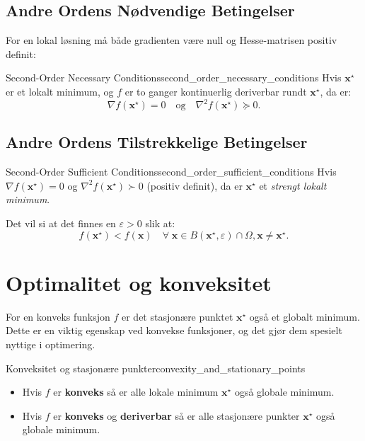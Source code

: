 \subsection{Andre Ordens Nødvendige Betingelser}

For en lokal løsning må både gradienten være null og Hesse-matrisen positiv definit:

\begin{theorem}{Second-Order Necessary Conditions}{second_order_necessary_conditions}
	Hvis \(\mathbf{x}^\star\) er et lokalt minimum, og \(f\) er to ganger kontinuerlig deriverbar rundt \(\mathbf{x}^\star\), da er:
	\[
		\nabla f(\mathbf{x}^\star) = 0 \quad \text{og} \quad \nabla^2 f(\mathbf{x}^\star) \succeq 0.
	\]
\end{theorem}

\subsection{Andre Ordens Tilstrekkelige Betingelser}

\begin{theorem}{Second-Order Sufficient Conditions}{second_order_sufficient_conditions}
	Hvis \(\nabla f(\mathbf{x}^\star) = 0\) og \(\nabla^2 f(\mathbf{x}^\star) \succ 0\) (positiv definit), da er \(\mathbf{x}^\star\) et \emph{strengt lokalt minimum}.

	\medskip

	Det vil si at det finnes en \(\varepsilon > 0\) slik at:
	\[
		f(\mathbf{x}^\star) < f(\mathbf{x})  \quad \forall \; \mathbf{x} \in B(\mathbf{x}^\star, \varepsilon) \cap \Omega, \mathbf{x} \neq \mathbf{x}^\star.
	\]
\end{theorem}

\section{Optimalitet og konveksitet}
\label{sec:optimality_and_convexity}
For en konveks funksjon \(f\) er det stasjonære punktet \(\mathbf{x}^\star\) også et globalt minimum. Dette er en viktig egenskap ved konvekse funksjoner, og det gjør dem spesielt nyttige i optimering.

\begin{remark}{Konveksitet og stasjonære punkter}{convexity_and_stationary_points}
	\begin{itemize}
		\item Hvis \(f\) er \textbf{konveks} så er alle lokale minimum \(\mathbf{x}^\star\) også globale minimum.
		\item Hvis \(f\) er \textbf{konveks} og \textbf{deriverbar} så er alle stasjonære punkter \(\mathbf{x}^\star\) også globale minimum.
	\end{itemize}
\end{remark}

